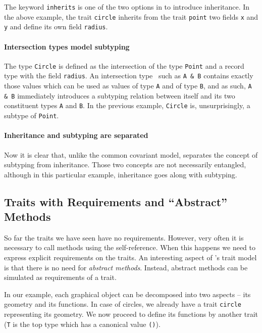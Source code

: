 The keyword \lstinline{inherits} is one of the two options in \name to introduce
inheritance. In the above example, the trait \lstinline{circle} inherits from
the trait \lstinline{point} two fields \lstinline{x} and \lstinline{y}
and define its own field \lstinline{radius}.

\paragraph{Intersection types model subtyping}
The type \lstinline{Circle} is defined as the intersection of the type
\lstinline{Point} and a record type with the field \lstinline{radius}. An
intersection type~\cite{coppo1981functional,pottinger1980type} such as
\lstinline{A & B} contains exactly those values which can be used as values of
type \lstinline{A} and of type \lstinline{B}, and as such, \lstinline{A & B}
immediately introduces a subtyping relation between itself and its two
constituent types \lstinline{A} and \lstinline{B}. In the previous example,
\lstinline{Circle} is, unsurprisingly, a subtype of \lstinline{Point}.

\paragraph{Inheritance and subtyping are separated}
Now it is clear that, unlike the common covariant
model, \name separates the concept of subtyping from inheritance. Those two
concepts are not necessarily entangled, although in this particular example,
inheritance goes along with subtyping.

\subsection{Traits with Requirements and ``Abstract'' Methods}

So far the traits we have seen have no requirements. However, very often it is
necessary to call methods using the self-reference. When this happens
we need to express explicit requirements on the traits. An interesting aspect
of \name's trait model is that there is no need for \emph{abstract
  methods}. Instead, abstract methods can be simulated as requirements 
of a trait. 

In our example, each graphical object can be decomposed into two aspects -- its
geometry and its functions. In case of circles, we already have a trait
\lstinline{circle} representing its geometry. We now proceed to define its
functions by another trait (\lstinline{T} is the top type which has a canonical
value \lstinline{()}).

